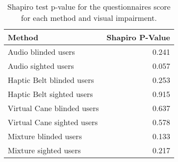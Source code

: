 
\begin{table}[!htb]
\centering
\caption{Shapiro test p-value for the questionnaires score for each method and visual impairment.}
\label{tab:shapiro_questionnaires}
\begin{tabular}{lr}
\toprule
                    Method &  Shapiro P-Value \\
\midrule
       Audio blinded users &            0.241 \\
       Audio sighted users &            0.057 \\
 Haptic Belt blinded users &            0.253 \\
 Haptic Belt sighted users &            0.915 \\
Virtual Cane blinded users &            0.637 \\
Virtual Cane sighted users &            0.578 \\
     Mixture blinded users &            0.133 \\
     Mixture sighted users &            0.217 \\
\bottomrule
\end{tabular}
\end{table}

